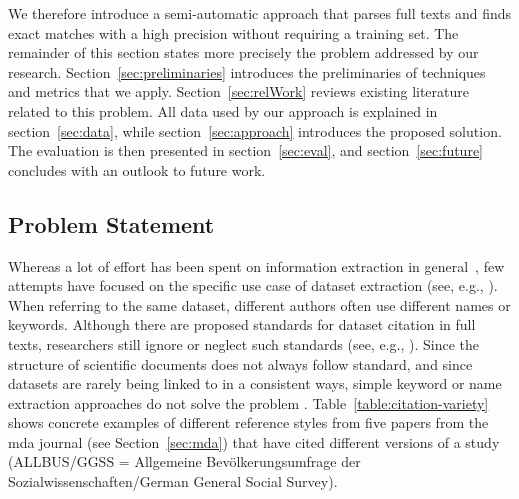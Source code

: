 \documentclass{IOS-Book-Article}
\begin{document}
We therefore introduce a semi-automatic approach that parses full texts and finds exact matches with a high precision without requiring a training set. 
The remainder of this section states more precisely the problem addressed by our research.
Section~\ref{sec:preliminaries} introduces the preliminaries of techniques and metrics that we apply.
Section~\ref{sec:relWork} reviews existing literature related to this problem.
All data used by our approach is explained in section~\ref{sec:data}, while section~\ref{sec:approach} introduces the proposed solution.
The evaluation is then presented in section~\ref{sec:eval}, and section~\ref{sec:future} concludes with an outlook to future work. 
 
\subsection{Problem Statement}
Whereas a lot of effort has been spent on information extraction in general~\citep{Sarawagi2007}, few attempts have focused on the specific use case of dataset extraction (see, e.g., \citep{MeiyuLu2012}). 
When referring to the same dataset, different authors often use different names or keywords.
Although there are proposed standards for dataset citation in full texts, researchers still ignore or neglect such standards (see, e.g., \cite{altman2007proposed}).
Since the structure of scientific documents does not always follow standard, and since datasets are rarely being linked to in a consistent ways,
simple keyword or name extraction approaches do not solve the problem \citep{Nadeau2007}. 
Table~\ref{table:citation-variety} shows concrete examples of different reference styles from five papers from the mda journal (see Section~\ref{sec:mda}) that have cited different versions of a study (ALLBUS/GGSS = Allgemeine Bev\"olkerungsumfrage der Sozialwissenschaften/German General Social Survey).
\end{document}
